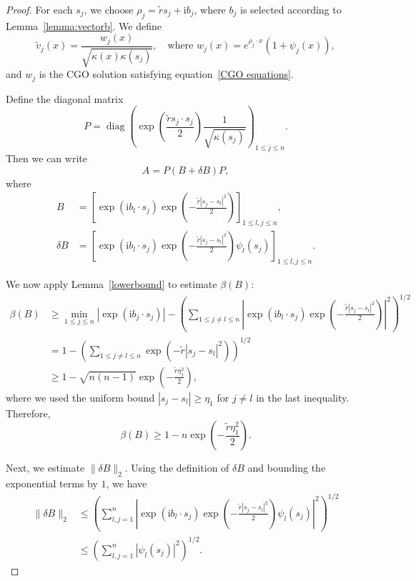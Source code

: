 \documentclass[12pt]{amsart}
\begin{document}
\begin{proof}
For each $s_j$, we choose $\rho_j = \tilde{r} s_j + \mathrm{i} b_j$, where $b_j$ is selected according to Lemma~\ref{lemma:vectorb}. We define
\begin{equation*}
    \tilde{v}_j(x) = \frac{w_j(x)}{\sqrt{\kappa(x)\kappa(s_j)}}, \quad \text{where } w_j(x) = e^{\rho_j \cdot x}\left(1 + \psi_j(x)\right),
\end{equation*}
and $w_j$ is the CGO solution satisfying equation~\eqref{CGO equations}.

Define the diagonal matrix
\[
P = \operatorname{diag}\left( \exp\left(\frac{\tilde{r} s_j \cdot s_j}{2} \right) \frac{1}{\sqrt{\kappa(s_j)}} \right)_{1 \leq j \leq n}.
\]
Then we can write
\[
A = P (B + \delta B) P,
\]
where
\begin{align*}
    B &= \left[ \exp(\mathrm{i} b_l \cdot s_j) \exp\left(-\frac{\tilde{r} |s_j - s_l|^2}{2}\right) \right]_{1 \leq l,j \leq n}, \\
    \delta B &= \left[ \exp(\mathrm{i} b_l \cdot s_j) \exp\left(-\frac{\tilde{r} |s_j - s_l|^2}{2}\right) \psi_l(s_j) \right]_{1 \leq l,j \leq n}.
\end{align*}

We now apply Lemma~\ref{lowerbound} to estimate $\beta(B)$:
\begin{align*}
    \beta(B) 
    &\geq \min_{1 \leq j \leq n} |\exp(\mathrm{i} b_j \cdot s_j)| 
        - \left( \sum_{1 \leq j \neq l \leq n} 
        \left| \exp\left(\mathrm{i} b_l \cdot s_j\right) 
        \exp\left(-\frac{\tilde{r} |s_j - s_l|^2}{2} \right) \right|^2 \right)^{1/2} \\
    &= 1 - \left( \sum_{1 \leq j \neq l \leq n} 
        \exp\left(-\tilde{r} |s_j - s_l|^2 \right) \right)^{1/2} \\
    &\geq 1 - \sqrt{n(n-1)} \exp\left(-\frac{\tilde{r} \eta_1^2}{2} \right),
\end{align*}
where we used the uniform bound $|s_j - s_l| \geq \eta_1$ for $j \neq l$ in the last inequality. Therefore,
\begin{equation}\label{eq:betaB}
    \beta(B) \geq 1 - n \exp\left(-\frac{\tilde{r} \eta_1^2}{2} \right).
\end{equation}

Next, we estimate $\|\delta B\|_2$. Using the definition of $\delta B$ and bounding the exponential terms by $1$, we have
\begin{align*}
    \|\delta B\|_2 
    &\leq \left( \sum_{l,j=1}^n 
        \left| \exp(\mathrm{i} b_l \cdot s_j) 
        \exp\left(-\frac{\tilde{r} |s_j - s_l|^2}{2} \right) \psi_l(s_j) \right|^2 \right)^{1/2} \\
    &\leq \left( \sum_{l,j=1}^n 
        |\psi_l(s_j)|^2 \right)^{1/2}.
\end{align*}


\end{proof}
\end{document}
